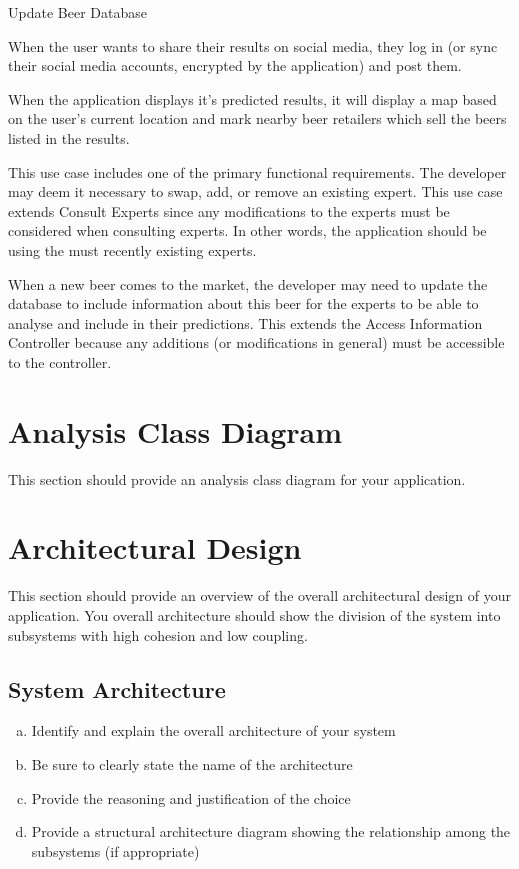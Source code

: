 \documentclass[]{article}
\begin{document}
\begin{labeling}{Update Beer Database}
\item [Share on Social Media] When the user wants to share their results on social media, they log in (or sync their social media accounts, encrypted by the application) and post them.
\item [Open Nearby Locations] When the application displays it's predicted results, it will display a map based on the user's current location and mark nearby beer retailers which sell the beers listed in the results.
\item [Edit Expert] This use case includes one of the primary functional requirements. The developer may deem it necessary to swap, add, or remove an existing expert. This use case extends Consult Experts since any modifications to the experts must be considered when consulting experts. In other words, the application should be using the must recently existing experts.
\item [Update Beer Database] When a new beer comes to the market, the developer may need to update the database to include information about this beer for the experts to be able to analyse and include in their predictions. This extends the Access Information Controller because any additions (or modifications in general) must be accessible to the controller. 
\end{labeling}

\newpage
\section{Analysis Class Diagram}
\label{sec:analysis_class_diagram}
This section should provide an analysis class diagram for your application.


\section{Architectural Design}
\label{sec:architectural_design}
This section should provide an overview of the overall architectural design of your application. You overall architecture should show the division of the system into subsystems with high cohesion and low coupling.

\subsection{System Architecture}
\label{sub:system_architecture}
\begin{enumerate}[a)]
	\item Identify and explain the overall architecture of your system
	\item Be sure to clearly state the name of the architecture
	\item Provide the reasoning and justification of the choice
	\item Provide a structural architecture diagram showing the relationship among the subsystems (if appropriate)
\end{enumerate}
\end{document}
